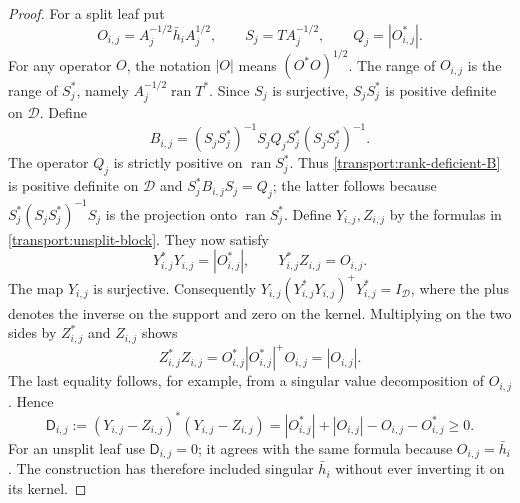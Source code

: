 \begin{proof}
For a split leaf put
\[
 O_{i,j}=A_j^{-1/2}\bar h_iA_j^{1/2},\qquad
 S_j=TA_j^{-1/2},\qquad Q_j=|O_{i,j}^*|.
\]
For any operator $O$, the notation $|O|$ means $(O^*O)^{1/2}$.
The range of $O_{i,j}$ is the range of $S_j^*$, namely
$A_j^{-1/2}\operatorname{ran}T^*$.  Since $S_j$ is surjective,
$S_jS_j^*$ is positive definite on $\mathcal D$.  Define
\begin{equation}\label{transport:rank-deficient-B}
 B_{i,j}=(S_jS_j^*)^{-1}S_jQ_jS_j^*(S_jS_j^*)^{-1}.
\end{equation}
The operator $Q_j$ is strictly positive on $\operatorname{ran}S_j^*$.
Thus \eqref{transport:rank-deficient-B} is positive definite on
$\mathcal D$ and $S_j^*B_{i,j}S_j=Q_j$; the latter follows because
$S_j^*(S_jS_j^*)^{-1}S_j$ is the projection onto
$\operatorname{ran}S_j^*$.  Define $Y_{i,j},Z_{i,j}$ by the formulas
in \eqref{transport:unsplit-block}.  They now satisfy
\[
 Y_{i,j}^*Y_{i,j}=|O_{i,j}^*|,
 \qquad Y_{i,j}^*Z_{i,j}=O_{i,j}.
\]
The map $Y_{i,j}$ is surjective.  Consequently
$Y_{i,j}(Y_{i,j}^*Y_{i,j})^+Y_{i,j}^*=I_{\mathcal D}$, where the plus
denotes the inverse on the support and zero on the kernel.  Multiplying
on the two sides by $Z_{i,j}^*$ and $Z_{i,j}$ shows
\[
 Z_{i,j}^*Z_{i,j}
 =O_{i,j}^*|O_{i,j}^*|^+O_{i,j}=|O_{i,j}|.
\]
The last equality follows, for example, from a singular value
decomposition of $O_{i,j}$.  Hence
\begin{equation}\label{transport:skew-square}
 \mathsf D_{i,j}:=(Y_{i,j}-Z_{i,j})^*(Y_{i,j}-Z_{i,j})
 =|O_{i,j}^*|+|O_{i,j}|-O_{i,j}-O_{i,j}^*\geq0.
\end{equation}
For an unsplit leaf use $\mathsf D_{i,j}=0$; it agrees with the same
formula because $O_{i,j}=\bar h_i$.  The construction has therefore
included singular $\bar h_i$ without ever inverting it on its kernel.


\end{proof}
